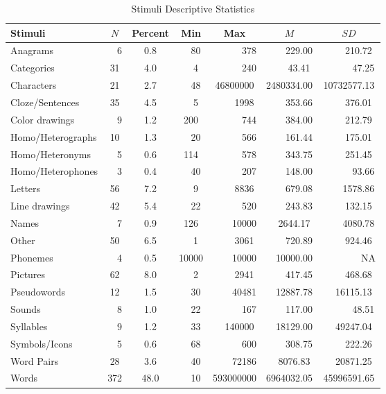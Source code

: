 \documentclass[english,man]{apa6}
\theoremstyle{definition}
\theoremstyle{definition}
\theoremstyle{definition}
\theoremstyle{remark}
\begin{document}
\begin{table}[tbp]
\begin{center}
\begin{threeparttable}
\caption{\label{tab:stim-table}Stimuli Descriptive Statistics}
\small{
\begin{tabular}{lcccccc}
\toprule
Stimuli & $N$ & Percent & Min & Max & $M$ & $SD$\\
\midrule
Anagrams & \ \ 6 & 0.8 & \ \ 80 & \ \ \ \ \ \ 378 & \ \ \ \ 229.00 & \ \ \ \  210.72\\
Categories & 31 & 4.0 & \ \  4 & \ \ \ \ \ \ 240 & \ \ \ \  43.41 & \ \ \ \ \ \ 47.25\\
Characters & 21 & 2.7 & \ \ 48 & 46800000 & 2480334.00 & 10732577.13\\
Cloze/Sentences & 35 & 4.5 & \ \  5 & \ \ \ \  1998 & \ \ \ \ 353.66 & \ \ \ \  376.01\\
Color drawings & \ \ 9 & 1.2 & 200 & \ \ \ \ \ \ 744 & \ \ \ \ 384.00 & \ \ \ \  212.79\\
Homo/Heterographs & 10 & 1.3 & \ \ 20 & \ \ \ \ \ \ 566 & \ \ \ \ 161.44 & \ \ \ \  175.01\\
Homo/Heteronyms & \ \ 5 & 0.6 & 114 & \ \ \ \ \ \ 578 & \ \ \ \ 343.75 & \ \ \ \  251.45\\
Homo/Heterophones & \ \ 3 & 0.4 & \ \ 40 & \ \ \ \ \ \ 207 & \ \ \ \ 148.00 & \ \ \ \ \ \ 93.66\\
Letters & 56 & 7.2 & \ \  9 & \ \ \ \  8836 & \ \ \ \ 679.08 & \ \ \ \ 1578.86\\
Line drawings & 42 & 5.4 & \ \ 22 & \ \ \ \ \ \ 520 & \ \ \ \ 243.83 & \ \ \ \  132.15\\
Names & \ \ 7 & 0.9 & 126 & \ \ \ \ 10000 & \ \  2644.17 & \ \ \ \ 4080.78\\
Other & 50 & 6.5 & \ \  1 & \ \ \ \  3061 & \ \ \ \ 720.89 & \ \ \ \  924.46\\
Phonemes & \ \ 4 & 0.5 & 10000 & \ \ \ \ 10000 & \ \ 10000.00 & \ \ \ \ \ \ \ \  NA\\
Pictures & 62 & 8.0 & \ \  2 & \ \ \ \  2941 & \ \ \ \ 417.45 & \ \ \ \  468.68\\
Pseudowords & 12 & 1.5 & \ \ 30 & \ \ \ \ 40481 & \ \ 12887.78 & \ \  16115.13\\
Sounds & \ \ 8 & 1.0 & \ \ 22 & \ \ \ \ \ \ 167 & \ \ \ \ 117.00 & \ \ \ \ \ \ 48.51\\
Syllables & \ \ 9 & 1.2 & \ \ 33 & \ \  140000 & \ \ 18129.00 & \ \  49247.04\\
Symbols/Icons & \ \ 5 & 0.6 & \ \ 68 & \ \ \ \ \ \ 600 & \ \ \ \ 308.75 & \ \ \ \  222.26\\
Word Pairs & 28 & 3.6 & \ \ 40 & \ \ \ \ 72186 & \ \  8076.83 & \ \  20871.25\\
Words & 372 & 48.0 & \ \ 10 & 593000000 & 6964032.05 & 45996591.65\\
\bottomrule
\end{tabular}
}
\end{threeparttable}
\end{center}
\end{table}
\end{document}
